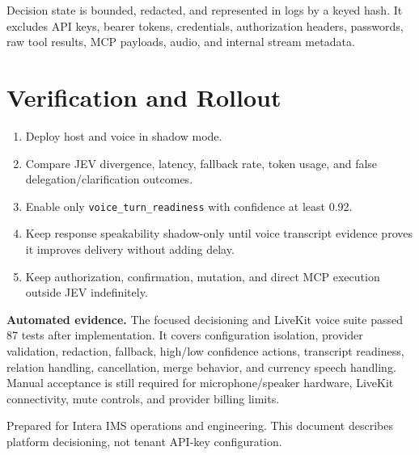 \documentclass[10pt]{article}
\begin{document}
Decision state is bounded, redacted, and represented in logs by a keyed hash. It excludes API keys, bearer tokens, credentials, authorization headers, passwords, raw tool results, MCP payloads, audio, and internal stream metadata.

\section{Verification and Rollout}
\begin{enumerate}[leftmargin=18pt,itemsep=4pt]
\item Deploy host and voice in shadow mode.
\item Compare JEV divergence, latency, fallback rate, token usage, and false delegation/clarification outcomes.
\item Enable only \texttt{voice\_turn\_readiness} with confidence at least 0.92.
\item Keep response speakability shadow-only until voice transcript evidence proves it improves delivery without adding delay.
\item Keep authorization, confirmation, mutation, and direct MCP execution outside JEV indefinitely.
\end{enumerate}

\textbf{Automated evidence.} The focused decisioning and LiveKit voice suite passed 87 tests after implementation. It covers configuration isolation, provider validation, redaction, fallback, high/low confidence actions, transcript readiness, relation handling, cancellation, merge behavior, and currency speech handling. Manual acceptance is still required for microphone/speaker hardware, LiveKit connectivity, mute controls, and provider billing limits.

\vfill
{\small\color{gray}Prepared for Intera IMS operations and engineering. This document describes platform decisioning, not tenant API-key configuration.}
\end{document}
